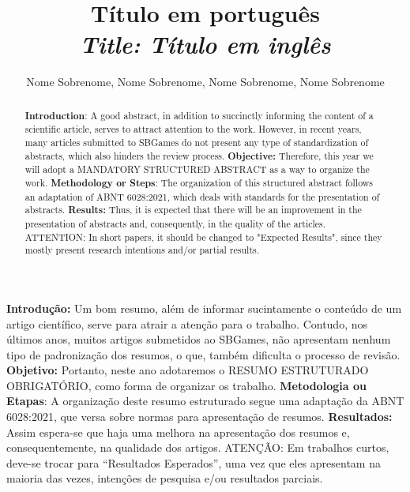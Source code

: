 \documentclass[12pt]{article}
\title{Título em português \\
\medskip
\small{
    \textit{Title: Título em inglês}
}
}
\author{Nome Sobrenome\inst{1}, Nome Sobrenome\inst{2}, Nome Sobrenome\inst{1}, Nome Sobrenome\inst{3} }
\begin{document}
 

\maketitle

\thispagestyle{plain}

\begin{abstract}
\textbf{Introduction}: A good abstract, in addition to succinctly informing the content of a scientific article, serves to attract attention to the work. However, in recent years, many articles submitted to SBGames do not present any type of standardization of abstracts, which also hinders the review process.
\textbf{Objective:} Therefore, this year we will adopt a MANDATORY STRUCTURED ABSTRACT as a way to organize the work.
\textbf{Methodology or Steps}: The organization of this structured abstract follows an adaptation of ABNT 6028:2021, which deals with standards for the presentation of abstracts.
\textbf{Results:} Thus, it is expected that there will be an improvement in the presentation of abstracts and, consequently, in the quality of the articles. ATTENTION: In short papers, it should be changed to "Expected Results", since they mostly present research intentions and/or partial results.
\end{abstract}

     
\begin{resumo} 
  \textbf{Introdução:} Um bom resumo, além de informar sucintamente o conteúdo de um artigo científico, serve para atrair a atenção para o trabalho. Contudo, nos últimos anos, muitos artigos submetidos ao SBGames, não apresentam nenhum tipo de padronização dos resumos, o que, também dificulta o processo de revisão. 
  \textbf{Objetivo:} Portanto, neste ano adotaremos o RESUMO ESTRUTURADO OBRIGATÓRIO, como forma de organizar os trabalho. 
  \textbf{Metodologia ou Etapas}: A organização deste resumo estruturado segue uma adaptação da ABNT 6028:2021, que versa sobre normas para apresentação de resumos.
  \textbf{Resultados:} Assim espera-se que haja uma melhora na apresentação dos resumos e, consequentemente, na qualidade dos artigos. ATENÇÃO: Em trabalhos curtos, deve-se trocar para ``Resultados Esperados'', uma vez que eles apresentam na maioria das vezes, intenções de pesquisa e/ou resultados parciais.
\end{resumo}

\end{document}
